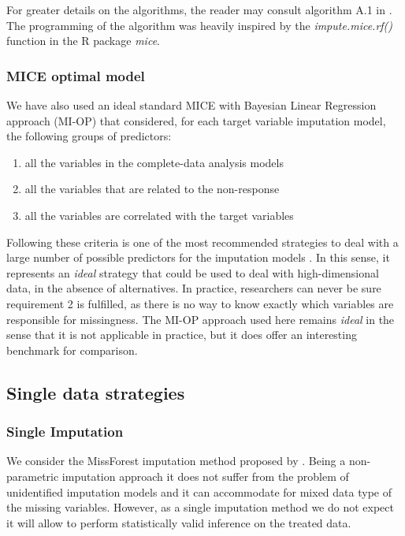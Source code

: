 	For greater details on the algorithms, the reader may consult algorithm A.1 in 
	\cite[p. 103, appendix B]{dooveEtAl:2014}.
	The programming of the algorithm was heavily inspired by the \emph{impute.mice.rf()} function in the 
	R package \emph{mice}.

\subsubsection{MICE optimal model}
	We have also used an ideal standard MICE with Bayesian Linear Regression approach (MI-OP)
	that considered, for each target variable imputation model, the following groups of 
	predictors:

	\begin{enumerate}

	\item all the variables in the complete-data analysis models
	\item all the variables that are related to the non-response
	\item all the variables are correlated with the target variables

	\end{enumerate}

	Following these criteria is one of the most recommended strategies to deal with a large number of 
	possible predictors for the imputation models \citep[p. 168]{vanBuuren:2012}.
	In this sense, it represents an \emph{ideal} strategy that could be used to deal with high-dimensional data,
	in the absence of alternatives.
	In practice, researchers can never be sure requirement 2 is fulfilled, as there is no way to know exactly 
	which variables are responsible for missingness. The MI-OP approach used here remains \emph{ideal} 
	in the sense that it is not applicable in practice, but it does offer an interesting benchmark for 
	comparison.
	
\subsection{Single data strategies}

\subsubsection{Single Imputation}
	We consider the MissForest imputation method proposed by \cite{stekhovenBuhlmann:2011}. Being a non-parametric
	imputation approach it does not suffer from the problem of unidentified imputation models and it can 
	accommodate for mixed data type of the missing variables. However, as a single imputation method we do not 
	expect it will allow to perform statistically valid inference on the treated data.

